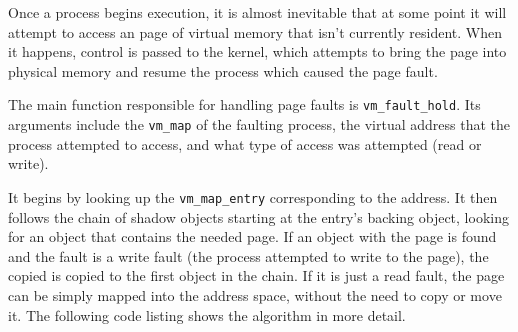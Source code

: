 \documentclass[shortabstract, english]{iithesis}
\begin{document}
Once a process begins execution, it is almost inevitable that at some point it
will attempt to access an page of virtual memory that isn't currently resident.
When it happens, control is passed to the kernel, which attempts to bring the
page into physical memory and resume the process which caused the page fault.

The main function responsible for handling page faults is
\texttt{vm_fault_hold}. Its arguments include the \texttt{vm_map}
of the faulting process, the virtual address that the process attempted to
access, and what type of access was attempted (read or write).

It begins by looking up the \texttt{vm_map_entry} corresponding to the
address. It then follows the chain of shadow objects starting at the entry's
backing object, looking for an object that contains the needed page. If an
object with the page is found and the fault is a write fault (the process
attempted to write to the page), the copied is copied to the first object in the
chain. If it is just a read fault, the page can be simply mapped into the
address space, without the need to copy or move it. The following code listing
shows the algorithm in more detail.
\end{document}
